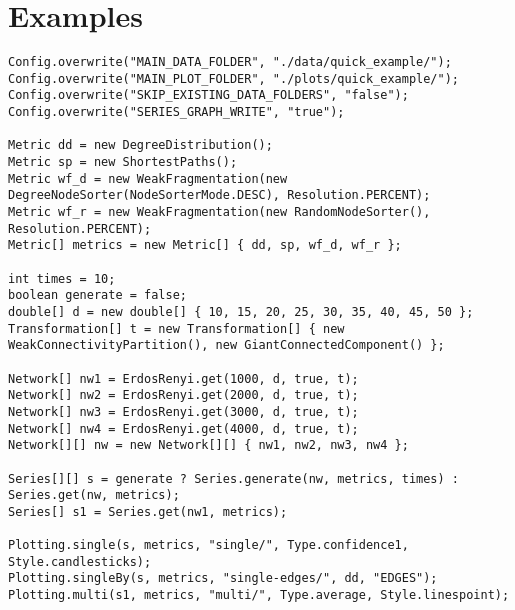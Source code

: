 
\section{Examples}
\label{sec:examples}




\begin{lstlisting}[label={lst:examples:example1},caption={Example 1}]
Config.overwrite("MAIN_DATA_FOLDER", "./data/quick_example/");
Config.overwrite("MAIN_PLOT_FOLDER", "./plots/quick_example/");
Config.overwrite("SKIP_EXISTING_DATA_FOLDERS", "false");
Config.overwrite("SERIES_GRAPH_WRITE", "true");

Metric dd = new DegreeDistribution();
Metric sp = new ShortestPaths();
Metric wf_d = new WeakFragmentation(new DegreeNodeSorter(NodeSorterMode.DESC), Resolution.PERCENT);
Metric wf_r = new WeakFragmentation(new RandomNodeSorter(), Resolution.PERCENT);
Metric[] metrics = new Metric[] { dd, sp, wf_d, wf_r };

int times = 10;
boolean generate = false;
double[] d = new double[] { 10, 15, 20, 25, 30, 35, 40, 45, 50 };
Transformation[] t = new Transformation[] { new WeakConnectivityPartition(), new GiantConnectedComponent() };

Network[] nw1 = ErdosRenyi.get(1000, d, true, t);
Network[] nw2 = ErdosRenyi.get(2000, d, true, t);
Network[] nw3 = ErdosRenyi.get(3000, d, true, t);
Network[] nw4 = ErdosRenyi.get(4000, d, true, t);
Network[][] nw = new Network[][] { nw1, nw2, nw3, nw4 };

Series[][] s = generate ? Series.generate(nw, metrics, times) : Series.get(nw, metrics);
Series[] s1 = Series.get(nw1, metrics);

Plotting.single(s, metrics, "single/", Type.confidence1, Style.candlesticks);
Plotting.singleBy(s, metrics, "single-edges/", dd, "EDGES");
Plotting.multi(s1, metrics, "multi/", Type.average, Style.linespoint);
\end{lstlisting}

